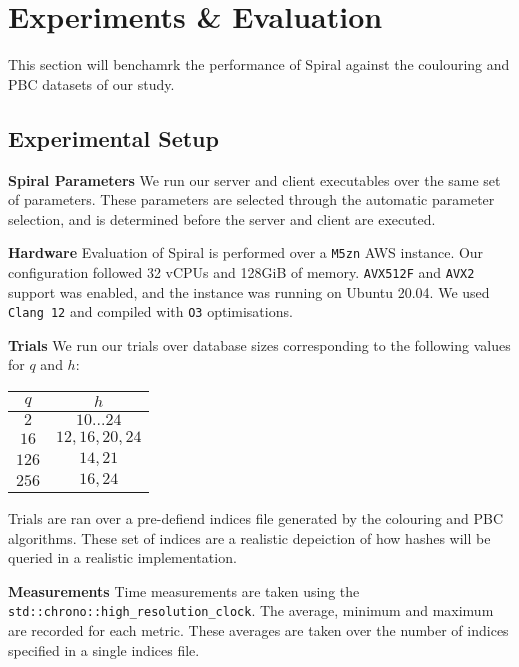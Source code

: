 \section{Experiments \& Evaluation}

This section will benchamrk the performance of Spiral against the coulouring and PBC
datasets of our study.

\subsection{Experimental Setup}

\textbf{Spiral Parameters} \hspace{0.3cm} We run our server and client executables over the same set
of parameters. These parameters are selected through the automatic parameter
selection\cite{1}, and is determined before the server and client are executed.

\textbf{Hardware} \hspace{0.3cm} Evaluation of Spiral is performed over a \texttt{M5zn} AWS
instance. Our configuration followed 32 vCPUs and 128GiB of memory. \texttt{AVX512F} and \texttt{AVX2}
support was enabled, and the instance was running on Ubuntu 20.04. We used \texttt{Clang
12} and compiled with \texttt{O3} optimisations.

\textbf{Trials} \hspace{0.3cm} We run our trials over database sizes corresponding to the
following values for $q$ and $h$:

\begin{center}
    \begin{tabular}{ |c|c| }
        \hline
        $q$ & $h$ \\
        \hline
        $2$   & $10...24$ \\
        $16$  & $12, 16, 20, 24$ \\
        $126$ & $14, 21$ \\
        $256$ & $16, 24$ \\
        \hline
    \end{tabular}
\end{center}

Trials are ran over a pre-defiend indices file generated by the colouring and PBC
algorithms. These set of indices are a realistic depeiction of how hashes will be queried
in a realistic implementation.

\textbf{Measurements} \hspace{0.3cm} Time measurements are taken using the
\texttt{std::chrono::high\_resolution\_clock}. The average, minimum and maximum are
recorded for each metric. These averages are taken over the number of indices specified in
a single indices file.


